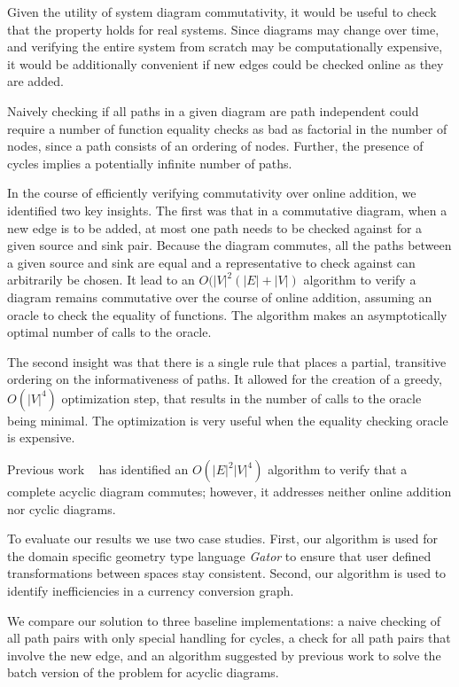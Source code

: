 \documentclass[sigplan,review,anonymous]{acmart}
\begin{document}
Given the utility of system diagram commutativity, it would be useful to check that the property holds for real systems.
Since diagrams may change over time, and verifying the entire system from scratch may be computationally expensive, it would be additionally convenient if new edges could be checked online as they are added.

Naively checking if all paths in a given diagram are path independent could require a number of function equality checks as bad as factorial in the number of nodes, since a path consists of an ordering of nodes.
Further, the presence of cycles implies a potentially infinite number of paths. 

In the course of efficiently verifying commutativity over online addition, we identified two key insights.
The first was that in a commutative diagram, when a new edge is to be added, at most one path needs to be checked against for a given source and sink pair.
Because the diagram commutes, all the paths between a given source and sink are equal and a representative to check against can arbitrarily be chosen.
It lead to an $O(|V|^2(|E|+|V|)$ algorithm to verify a diagram remains commutative over the course of online addition, assuming an oracle to check the equality of functions.
The algorithm makes an asymptotically optimal number of calls to the oracle.

The second insight was that there is a single rule that places a partial, transitive ordering on the informativeness of paths.
It allowed for the creation of a greedy, $O(|V|^4)$ optimization step, that results in the number of calls to the oracle being minimal.
The optimization is very useful when the equality checking oracle is expensive.

Previous work ~\cite{commutative} has identified an $O(|E|^2|V|^4)$ algorithm to verify that a complete acyclic diagram commutes; however, it addresses neither online addition nor cyclic diagrams.

To evaluate our results we use two case studies.
First, our algorithm is used for the domain specific geometry type language \textit{Gator} to ensure that user defined transformations between spaces stay consistent. Second, our algorithm is used to identify inefficiencies in a currency conversion graph.

We compare our solution to three baseline implementations: a naive checking of all path pairs with only special handling for cycles, a check for all path pairs that involve the new edge, and an algorithm suggested by previous work to solve the batch version of the problem for acyclic diagrams.
\end{document}
